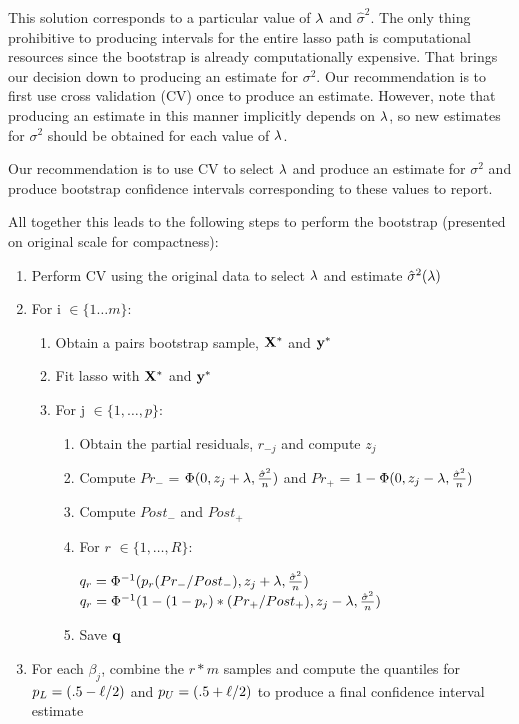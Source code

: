 This solution corresponds to a particular value of $\lambda$ and $\hat{\sigma}^2$. The only thing prohibitive to producing intervals for the entire lasso path is computational resources since the bootstrap is already computationally expensive. That brings our decision down to producing an estimate for $\sigma^2$. Our recommendation is to first use cross validation (CV) once to produce an estimate. However, note that producing an estimate in this manner implicitly depends on $\lambda$, so new estimates for $\sigma^2$ should be obtained for each value of $\lambda$.

Our recommendation is to use CV to select $\lambda$ and produce an estimate for $\sigma^2$ and produce bootstrap confidence intervals corresponding to these values to report.

All together this leads to the following steps to perform the bootstrap (presented on original scale for compactness):

\begin{enumerate}
\item Perform CV using the original data to select $\lambda$ and estimate $\hat{\sigma}^2(\lambda)$
\item For i $\in \lbrace 1 \ldots m \rbrace$:
\begin{enumerate}
\item Obtain a pairs bootstrap sample, $\mathbf{X}^*$ and $\mathbf{y}^*$
\item Fit lasso with $\mathbf{X}^*$ and $\mathbf{y}^*$
\item For j $\in \lbrace 1, \ldots, p \rbrace$:
	\begin{enumerate}
	\item Obtain the partial residuals, $r_{-j}$ and compute $z_j$
	\item Compute $Pr_{-}$ = $\Phi(0, z_j + \lambda, \frac{\hat{\sigma}^2}{n})$ and $Pr_{+}$ = $1 - \Phi(0, z_j - \lambda, \frac{\hat{\sigma}^2}{n})$
	\item Compute $Post_-$ and $Post_+$
	\item For $r$ $\in \lbrace 1, \ldots, R \rbrace$:
	\begin{algorithmic}
			\State $q_r = \Phi^{-1}(p_r(Pr_{-} / Post_{-}), z_j + \lambda, \frac{\hat{\sigma}^2}{n})$
		\Else
			\State $q_r = \Phi^{-1}(1 - (1 - p_r)*(Pr_{+} / Post_{+}), z_j - \lambda, \frac{\hat{\sigma}^2}{n})$
		\EndIf
	\end{algorithmic}
	\item Save $\mathbf{q}$
	\end{enumerate}
\end{enumerate}
\item For each $\beta_j$, combine the $r*m$ samples and compute the quantiles for $p_L = (.5 - \ell/2)$ and $p_U = (.5 + \ell/2)$ to produce a final confidence interval estimate
\end{enumerate}

